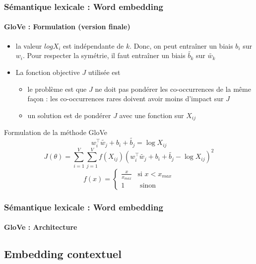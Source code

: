 \documentclass[xcolor=table]{beamer}
\begin{document}
\begin{frame}
\frametitle{Sémantique lexicale : Word embedding}
\framesubtitle{GloVe : Formulation (version finale)}
	
\begin{itemize}
	\item la valeur $log X_i$ est indépendante de $k$. Donc, on peut entraîner un biais $b_i$ sur $w_i$. Pour respecter la symétrie, il faut entraîner un biais $\tilde{b_k}$ sur $\tilde{w_k}$ 
	\item La fonction objective $J$ utilisée est 
	\begin{itemize}
		\item le problème est que $J$ ne doit pas pondérer les co-occurrences de la même façon : les co-occurrences rares doivent avoir moins d'impact sur $J$
		\item un solution est de pondérer $J$ avec une fonction sur $X_{ij}$
	\end{itemize}
\end{itemize}

\vspace{-6pt}
\begin{block}{Formulation de la méthode GloVe}\vspace{-6pt}
	\[w_i^\top \tilde{w_j} + b_i + \tilde{b_j} = \log X_{ij} \]
	\[J(\theta) = \sum_{i=1}^{V} \sum_{j=1}^{V} f(X_{ij}) (w_i^\top \tilde{w_j} + b_i + \tilde{b_j} - \log X_{ij})^2\]
	\vspace{-12pt}\[f(x) = \begin{cases}
	\frac{x}{x_{max}} & \text{si } x < x_{max} \\
	1 & \text{ sinon}
	\end{cases}\]
\vspace{-6pt}\end{block}
	
\end{frame}

\begin{frame}
\frametitle{Sémantique lexicale : Word embedding}
\framesubtitle{GloVe : Architecture}
	
\begin{center}
\end{center}
	
\end{frame}

\subsection{Embedding contextuel}
\end{document}
